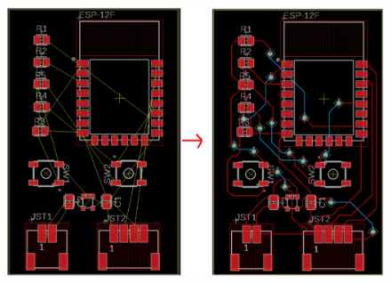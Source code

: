 \begin{enumerate}
\begin{figure}[H]
            \includegraphics[width=0.89\linewidth]{P1/img/routing5.png}
        \end{figure}
\end{enumerate}